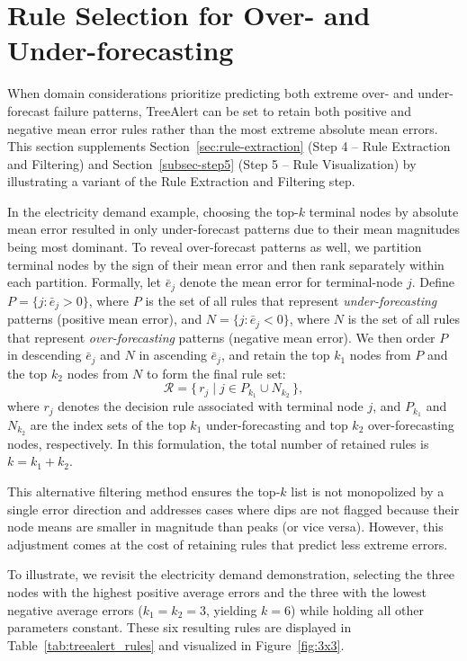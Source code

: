 \documentclass[12pt]{article}
\begin{document}
\clearpage
\section{Rule Selection for Over- and Under-forecasting}
\label{append-A}

When domain considerations prioritize predicting both extreme over- and under-forecast failure patterns, TreeAlert can be set to retain both positive and negative mean error rules rather than the most extreme absolute mean errors. 
This section supplements Section~\ref{sec:rule-extraction} (Step 4 -- Rule Extraction and Filtering) and Section~\ref{subsec-step5} (Step 5 -- Rule Visualization) by illustrating a variant of the Rule Extraction and Filtering step. 

In the electricity demand example, choosing the top-$k$ terminal nodes by absolute mean error resulted in only under-forecast patterns due to their mean magnitudes being most dominant. To reveal over-forecast patterns as well, we partition terminal nodes by the sign of their mean error and then rank separately within each partition. Formally, let $\bar e_j$ denote the mean error for terminal-node $j$. Define $P=\{j:\bar e_j>0\}$, where $P$ is the set of all rules that represent \textit{under-forecasting} patterns (positive mean error), and $N=\{j:\bar e_j<0\}$, where $N$ is the set of all rules that represent \textit{over-forecasting} patterns (negative mean error). We then order $P$ in descending $\bar e_j$ and $N$ in ascending $\bar e_j$, and retain the top $k_1$ nodes from $P$ and the top $k_2$ nodes from $N$ to form the final rule set:
\begin{equation}
\mathcal{R} = \{\, r_j \;|\; j \in P_{k_1} \cup N_{k_2} \,\},
\end{equation}
where $r_j$ denotes the decision rule associated with terminal node $j$, and $P_{k_1}$ and $N_{k_2}$ are the index sets of the top $k_1$ under-forecasting and top $k_2$ over-forecasting nodes, respectively. In this formulation, the total number of retained rules is $k = k_1 + k_2$. 

This alternative filtering method ensures the top-$k$ list is not monopolized by a single error direction and addresses cases where dips are not flagged because their node means are smaller in magnitude than peaks (or vice versa). However, this adjustment comes at the cost of retaining rules that predict less extreme errors.

To illustrate, we revisit the electricity demand demonstration, selecting the three nodes with the highest positive average errors and the three with the lowest negative average errors ($k_1 = k_2 = 3$, yielding $k = 6$) while holding all other parameters constant. These six resulting rules are displayed in Table~\ref{tab:treealert_rules} and visualized in Figure~\ref{fig:3x3}.
\end{document}
